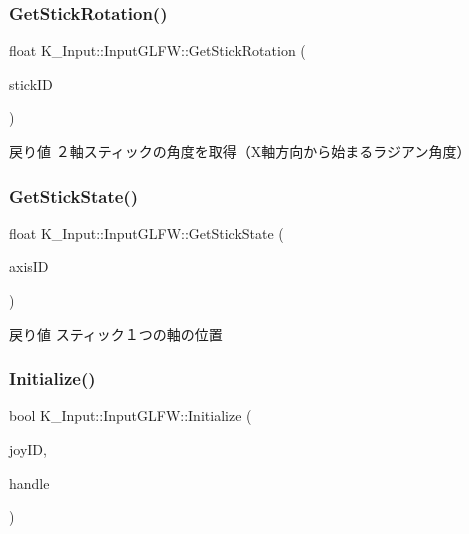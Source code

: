 \subsubsection{\texorpdfstring{Get\+Stick\+Rotation()}{GetStickRotation()}}
{\footnotesize\ttfamily float K\+\_\+\+Input\+::\+Input\+G\+L\+F\+W\+::\+Get\+Stick\+Rotation (\begin{DoxyParamCaption}\item[{\mbox{\hyperlink{namespace_k___input_a2a6df758ee5a36c29d234fe7a27beb2c}{Button\+ID}}}]{stick\+ID }\end{DoxyParamCaption})}

\begin{DoxyReturn}{戻り値}
２軸スティックの角度を取得（\+X軸方向から始まるラジアン角度） 
\end{DoxyReturn}
\mbox{\label{class_k___input_1_1_input_g_l_f_w_ab18a2edb87c07b7e4b6c747706a39081}} 
\subsubsection{\texorpdfstring{Get\+Stick\+State()}{GetStickState()}}
{\footnotesize\ttfamily float K\+\_\+\+Input\+::\+Input\+G\+L\+F\+W\+::\+Get\+Stick\+State (\begin{DoxyParamCaption}\item[{\mbox{\hyperlink{namespace_k___input_a2a6df758ee5a36c29d234fe7a27beb2c}{Button\+ID}}}]{axis\+ID }\end{DoxyParamCaption})}

\begin{DoxyReturn}{戻り値}
スティック１つの軸の位置 
\end{DoxyReturn}
\mbox{\label{class_k___input_1_1_input_g_l_f_w_adebfa33e196d75a37714a452622cf90e}} 
\subsubsection{\texorpdfstring{Initialize()}{Initialize()}}
{\footnotesize\ttfamily bool K\+\_\+\+Input\+::\+Input\+G\+L\+F\+W\+::\+Initialize (\begin{DoxyParamCaption}\item[{unsigned int}]{joy\+ID,  }\item[{G\+L\+F\+Wwindow $\ast$}]{handle }\end{DoxyParamCaption})}



